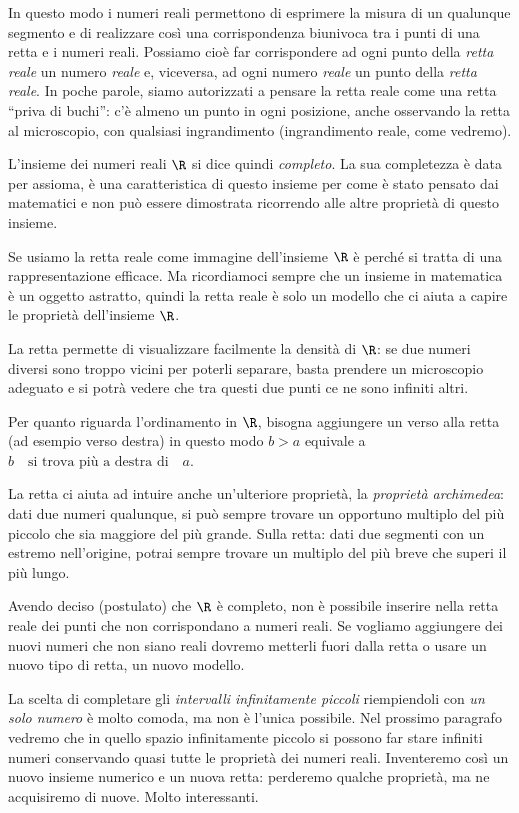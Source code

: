 In questo modo i numeri reali permettono di esprimere la misura di un qualunque 
segmento e di realizzare così una corrispondenza biunivoca tra i punti di una 
retta e i numeri reali. 
Possiamo cioè far corrispondere ad ogni punto della \emph{retta reale} un 
numero \emph{reale} e, viceversa, ad ogni numero \emph{reale} un punto 
della \emph{retta reale}. In poche parole, siamo
autorizzati a pensare la retta reale come una retta ``priva di buchi'':
c'è almeno un punto in ogni posizione, anche osservando la retta al 
microscopio, con qualsiasi ingrandimento (ingrandimento reale, come 
vedremo).

L'insieme dei numeri reali \(\R\) si dice quindi \emph{completo}. La sua 
completezza è data per assioma, è una caratteristica di questo insieme
per come è stato pensato dai matematici e non può essere dimostrata ricorrendo
alle altre proprietà di questo insieme.

Se usiamo la retta reale come immagine dell'insieme \(\R\) è perché
si tratta di una rappresentazione efficace. Ma ricordiamoci sempre che un 
insieme in matematica è un oggetto astratto, quindi la retta reale è solo
un modello che ci aiuta a capire le proprietà dell'insieme \(\R\).

La retta permette di visualizzare facilmente la densità di \(\R\): se due 
numeri diversi sono troppo vicini per poterli separare, basta prendere un 
microscopio adeguato e si potrà vedere che tra questi due punti ce ne sono 
infiniti altri.

Per quanto riguarda l'ordinamento in \(\R\), bisogna aggiungere un verso alla 
retta (ad esempio verso destra) in questo modo 
\(b > a\) equivale a \(b \quad \text{si trova più a destra di}\quad a\). 

La retta ci aiuta ad intuire anche un'ulteriore proprietà, 
la \emph{proprietà archimedea}: dati due numeri qualunque, si può sempre 
trovare un opportuno multiplo del più piccolo che sia maggiore del più grande.
Sulla retta: dati due segmenti con un estremo nell'origine, potrai sempre 
trovare un  multiplo del più breve che superi il più lungo.

Avendo deciso (postulato) che \(\R\) è completo, non è possibile inserire
nella retta reale dei punti che non corrispondano a numeri reali. 
Se vogliamo aggiungere dei nuovi numeri che non siano reali dovremo metterli 
fuori dalla retta o usare un nuovo tipo di retta, un nuovo modello.

La scelta di completare gli \emph{intervalli infinitamente piccoli} 
riempiendoli con \emph{un solo numero} è molto comoda, ma non è l'unica 
possibile. 
Nel prossimo paragrafo vedremo che in quello spazio infinitamente piccolo si 
possono far stare infiniti numeri conservando quasi tutte le proprietà dei 
numeri reali. 
Inventeremo così un nuovo insieme numerico e un nuova retta: 
perderemo qualche proprietà, ma ne acquisiremo di nuove.
Molto interessanti.

